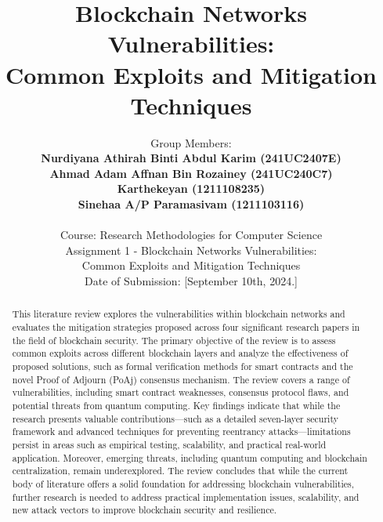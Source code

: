 \documentclass[12pt,a4paper]{article}
\title{Blockchain Networks Vulnerabilities: \\
Common Exploits and Mitigation Techniques }
\author{Group Members: \\
\textbf{Nurdiyana Athirah Binti Abdul Karim (241UC2407E)} \\
\textbf{Ahmad Adam Affnan Bin Rozainey (241UC240C7)} \\
\textbf{Karthekeyan (1211108235)} \\
\textbf{Sinehaa A/P Paramasivam (1211103116)} \\
\\
Course: Research Methodologies for Computer Science \\
Assignment 1 - Blockchain Networks Vulnerabilities:\\
Common Exploits and Mitigation Techniques \\
Date of Submission: [September 10th, 2024.]}
\date{}
\begin{document}
\maketitle
\newpage

\begin{abstract}
    \noindent
    This literature review explores the vulnerabilities within blockchain networks and evaluates the mitigation strategies proposed across four significant research papers in the field of blockchain security. The primary objective of the review is to assess common exploits across different blockchain layers and analyze the effectiveness of proposed solutions, such as formal verification methods for smart contracts and the novel Proof of Adjourn (PoAj) consensus mechanism. The review covers a range of vulnerabilities, including smart contract weaknesses, consensus protocol flaws, and potential threats from quantum computing. Key findings indicate that while the research presents valuable contributions—such as a detailed seven-layer security framework and advanced techniques for preventing reentrancy attacks—limitations persist in areas such as empirical testing, scalability, and practical real-world application. Moreover, emerging threats, including quantum computing and blockchain centralization, remain underexplored. The review concludes that while the current body of literature offers a solid foundation for addressing blockchain vulnerabilities, further research is needed to address practical implementation issues, scalability, and new attack vectors to improve blockchain security and resilience.
\end{abstract}
\newpage

\tableofcontents
\newpage

\end{document}
